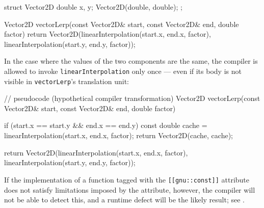 \begin{emcppshiddenlisting}[emcppsbatch={e7,e8}]
struct Vector2D {
    double x, y;
    Vector2D(double, double);
};
\end{emcppshiddenlisting}
\begin{emcppslisting}[emcppsbatch=e7]
Vector2D vectorLerp(const Vector2D& start, const Vector2D& end, double factor)
{
    return Vector2D(linearInterpolation(start.x, end.x, factor),
                    linearInterpolation(start.y, end.y, factor));
}
\end{emcppslisting}

\noindent In the case where the values of the two components
are the same, the compiler is allowed to invoke
\lstinline!linearInterpolation! only once --- even if its body is not
visible in \lstinline!vectorLerp!'s translation unit:\newpage%

\begin{emcppslisting}[emcppsbatch=e8]
// pseudocode (hypothetical compiler transformation)
Vector2D vectorLerp(const Vector2D& start, const Vector2D& end, double factor)
{
    if (start.x == start.y && end.x == end.y)
    {
        const double cache = linearInterpolation(start.x, end.x, factor);
        return Vector2D(cache, cache);
    }

    return Vector2D(linearInterpolation(start.x, end.x, factor),
                    linearInterpolation(start.y, end.y, factor));
}
\end{emcppslisting}

\noindent If the implementation of a function tagged with the
\lstinline![[gnu::const]]! attribute does not satisfy limitations imposed by
the attribute, however, the compiler will not be able to detect this, and a runtime
defect will be the likely result;
  see .

